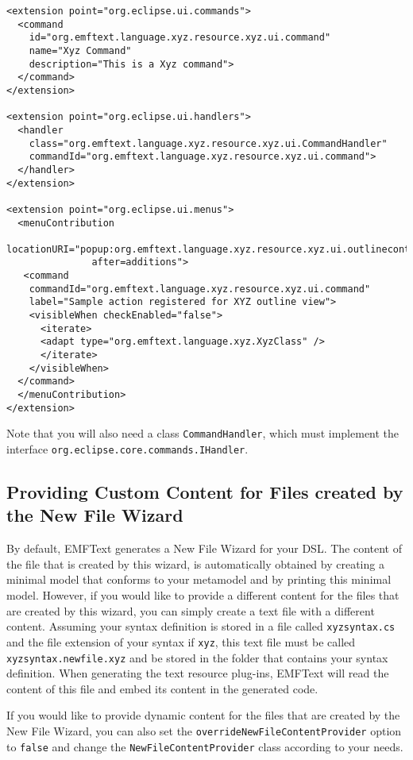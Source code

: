 \lstset{language=XML}
\begin{lstlisting}
<extension point="org.eclipse.ui.commands">
  <command
    id="org.emftext.language.xyz.resource.xyz.ui.command"
    name="Xyz Command"
    description="This is a Xyz command">
  </command>
</extension>

<extension point="org.eclipse.ui.handlers">
  <handler
    class="org.emftext.language.xyz.resource.xyz.ui.CommandHandler"
    commandId="org.emftext.language.xyz.resource.xyz.ui.command">
  </handler>
</extension>

<extension point="org.eclipse.ui.menus">
  <menuContribution 
  locationURI="popup:org.emftext.language.xyz.resource.xyz.ui.outlinecontext?
               after=additions">
   <command
    commandId="org.emftext.language.xyz.resource.xyz.ui.command"
    label="Sample action registered for XYZ outline view">
    <visibleWhen checkEnabled="false">
      <iterate>
      <adapt type="org.emftext.language.xyz.XyzClass" />
      </iterate>
    </visibleWhen>
  </command>
  </menuContribution>
</extension>
\end{lstlisting}

Note that you will also need a class \texttt{CommandHandler}, which must
implement the interface \texttt{org.eclipse.core.commands.IHandler}.

\subsection{Providing Custom Content for Files created by the New File Wizard}

By default, EMFText generates a New File Wizard for your DSL. The content of the
file that is created by this wizard, is automatically obtained by creating a
minimal model that conforms to your metamodel and by printing this minimal
model. However, if you would like to provide a different content for the files
that are created by this wizard, you can simply create a text file with a
different content. Assuming your syntax definition is stored in a file called
\texttt{xyzsyntax.cs} and the file extension of your syntax if
\texttt{xyz}, this text file must be called \texttt{xyzsyntax.newfile.xyz} and
be stored in the folder that contains your syntax definition.
When generating the text resource plug-ins, EMFText will read the content of
this file and embed its content in the generated code.

If you would like to provide dynamic content for the files that are created by
the New File Wizard, you can also set the
\texttt{overrideNewFileContentProvider} option to \texttt{false} and change the
\texttt{NewFileContentProvider} class according to your needs.

